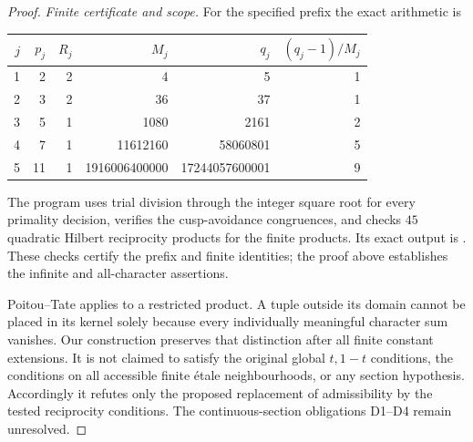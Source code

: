 \begin{proof}
\emph{Finite certificate and scope.}
For the specified prefix the exact arithmetic is
\begin{center}
\small
\begin{tabular}{rrrrrr}
$j$&$p_j$&$R_j$&$M_j$&$q_j$&$(q_j-1)/M_j$\\
\hline
1&2&2&4&5&1\\
2&3&2&36&37&1\\
3&5&1&1080&2161&2\\
4&7&1&11612160&58060801&5\\
5&11&1&1916006400000&17244057600001&9
\end{tabular}
\end{center}
The program 
uses trial division through the integer square root for
every primality decision, verifies the cusp-avoidance
congruences, and checks $45$ quadratic Hilbert reciprocity
products for the finite products. Its exact output is
.
These checks certify the prefix and finite identities; the
proof above establishes the infinite and all-character
assertions.

Poitou--Tate applies to a restricted product. A tuple
outside its domain cannot be placed in its kernel solely
because every individually meaningful character sum
vanishes. Our construction preserves that distinction after
all finite constant extensions. It is not claimed to
satisfy the original global $t,1-t$ conditions, the
conditions on all accessible finite \'etale neighbourhoods,
or any section hypothesis. Accordingly it refutes only
the proposed replacement of admissibility by the tested
reciprocity conditions. The continuous-section obligations
D1--D4 remain unresolved.
\end{proof}
